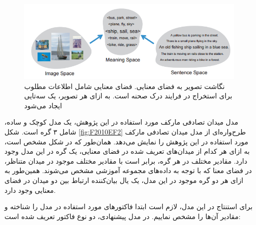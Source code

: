 \begin{figure}[h]
\center
\includegraphics[scale=0.7]{./Imgs/farhadi2010every_fig1.png}
\caption[نگاشت تصویر به فضای معنایی]{
نگاشت تصویر به فضای معنایی. فضای معنایی شامل اطلاعات مطلوب برای استخراج در فرایند درک صحنه است. به ازای هر تصویر، یک سه‌تایی ایجاد می‌شود\cite{Farhadi2010every.}
}
\label{fig:F2010EF1}
\end{figure}

مدل میدان تصادفی مارکف مورد استفاده در این پژوهش، یک مدل کوچک و ساده، شامل ۳ گره است. شکل \ref{fig:F2010EF2}
طرح‌واره‌ای از مدل میدان تصادفی مارکف مورد استفاده در این پژوهش را نمایش می‌دهد. همان‌طور که در شکل مشخص است،  به ازای هر کدام از میدان‌های تعریف شده در فضای معنایی، یک گره در این مدل وجود دارد. مقادیر مختلف در هر گره، برابر است با مقادیر مختلف موجود در میدان متناظر، در فضای معنا که با توجه به داده‌های مجموعه‌‌ ‌آموزشی مشخص می‌شوند. همین‌طور به ازای هر دو گره موجود در این مدل، یک یال بیان‌کننده ارتباط بین دو میدان در فضای معنایی وجود دارد.

برای استنتاج در این مدل، لازم است ابتدا فاکتور‌های مورد استفاده در مدل را شناخته و مقادیر آن‌ها را مشخص نماییم. در مدل پیشنهادی، دو نوع فاکتور تعریف شده است:

